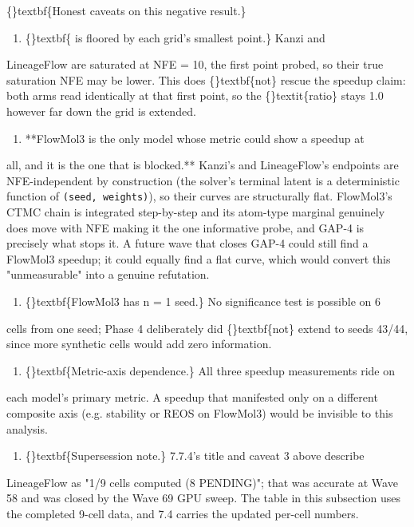 \documentclass{article}
\begin{document}
\{\}textbf\{Honest caveats on this negative result.\}

\begin{enumerate}
\item \{\}textbf\{ is floored by each grid's smallest point.\} Kanzi and
\end{enumerate}
LineageFlow are saturated at NFE = 10, the first point probed, so their true saturation NFE may be lower. This does \{\}textbf\{not\} rescue the speedup claim: both arms read identically at that first point, so the \{\}textit\{ratio\} stays 1.0 however far down the grid is extended.

\begin{enumerate}
\item **FlowMol3 is the only model whose metric could show a speedup at
\end{enumerate}
all, and it is the one that is blocked.** Kanzi's and LineageFlow's endpoints are NFE-independent by construction (the solver's terminal latent is a deterministic function of \texttt{(seed, weights)}), so their curves are structurally flat. FlowMol3's CTMC chain is integrated step-by-step and its atom-type marginal genuinely does move with NFE  making it the one informative probe, and GAP-4 is precisely what stops it. A future wave that closes GAP-4 could still find a FlowMol3 speedup; it could equally find a flat curve, which would convert this "unmeasurable" into a genuine refutation.

\begin{enumerate}
\item \{\}textbf\{FlowMol3 has n = 1 seed.\} No significance test is possible on 6
\end{enumerate}
cells from one seed; Phase 4 deliberately did \{\}textbf\{not\} extend to seeds 43/44, since more synthetic cells would add zero information.

\begin{enumerate}
\item \{\}textbf\{Metric-axis dependence.\} All three speedup measurements ride on
\end{enumerate}
each model's primary metric. A speedup that manifested only on a different composite axis (e.g. stability or REOS on FlowMol3) would be invisible to this analysis.

\begin{enumerate}
\item \{\}textbf\{Supersession note.\} 7.7.4's title and caveat 3 above describe
\end{enumerate}
LineageFlow as "1/9 cells computed (8 PENDING)"; that was accurate at Wave 58 and was closed by the Wave 69 GPU sweep. The table in this subsection uses the completed 9-cell data, and 7.4 carries the updated per-cell numbers.
\end{document}
